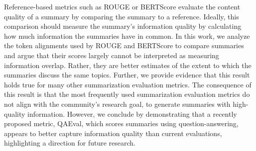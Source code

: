 Reference-based metrics such as ROUGE or BERTScore evaluate the content quality of a summary by comparing the summary to a reference. Ideally, this comparison should measure the summary's information quality by calculating how much information the summaries have in common. In this work, we analyze the token alignments used by ROUGE and BERTScore to compare summaries and argue that their scores largely cannot be interpreted as measuring information overlap. Rather, they are better estimates of the extent to which the summaries discuss the same topics. Further, we provide evidence that this result holds true for many other summarization evaluation metrics. The consequence of this result is that the most frequently used summarization evaluation metrics do not align with the community's research goal, to generate summaries with high-quality information. However, we conclude by demonstrating that a recently proposed metric, QAEval, which scores summaries using question-answering, appears to better capture information quality than current evaluations, highlighting a direction for future research.
